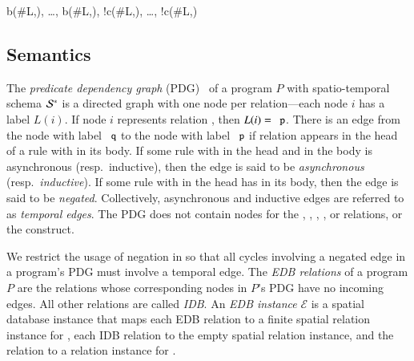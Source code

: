 \begin{Drules}
        {b(#L,), \ldots, b(#L,), !c(#L,), \ldots, !c(#L,)}
\end{Drules}





\subsection{Semantics}
\label{sec:semantics}
The {\em predicate dependency graph} (PDG)~\cite{ullmanbook} of a \lang program $P$ with spatio-temporal schema $\mathcal{S}^*$ is a directed graph with one node per relation---each node $i$ has a label $L(i)$.  If node $i$ represents relation , then $L(i) = \dedalus{p}$.  There is an edge from the node with label $\dedalus{q}$ to the node with label $\dedalus{p}$ if relation  appears in the head of a rule with  in its body.  If some rule with  in the head and  in the body is asynchronous (resp.\ inductive), then the edge is said to be {\em asynchronous} (resp.\ {\em inductive}).  If some rule with  in the head has  in its body, then the edge is said to be {\em negated}.  Collectively, asynchronous and inductive edges are referred to as {\em temporal edges}.  The PDG does not contain nodes for the , , , , or \dedalus{<} relations, or the  construct.

We restrict the usage of negation in \lang so that all cycles involving a negated edge in a \lang program's PDG must involve a temporal edge.
The {\em EDB relations} of a \lang program $P$ are the relations whose corresponding nodes in $P$'s PDG have no incoming edges.  All other relations are called {\em IDB}.
An {\em EDB instance} $\mathcal{E}$ is a spatial database instance that maps each EDB relation  to a finite spatial relation instance for , each IDB relation  to the empty spatial relation instance, and the  relation to a relation instance for .

